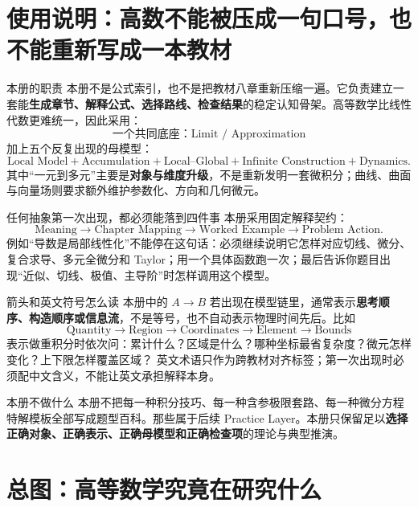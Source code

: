 \documentclass[11pt,a4paper,openany]{ctexbook}
\newcommand{\key}[1]{\textbf{\color{deep}#1}}
\begin{document}
\chapter*{使用说明：高数不能被压成一句口号，也不能重新写成一本教材}

\begin{corebox}{本册的职责}
本册不是公式索引，也不是把教材八章重新压缩一遍。它负责建立一套能\key{生成章节、解释公式、选择路线、检查结果}的稳定认知骨架。高等数学比线性代数更难统一，因此采用：
\[
\boxed{\text{一个共同底座：Limit / Approximation}}
\]
加上五个反复出现的母模型：
\[
\boxed{\text{Local Model}+\text{Accumulation}+\text{Local--Global}+\text{Infinite Construction}+\text{Dynamics}}.
\]
其中“一元到多元”主要是\key{对象与维度升级}，不是重新发明一套微积分；曲线、曲面与向量场则要求额外维护参数化、方向和几何微元。
\end{corebox}

\begin{methodbox}{任何抽象第一次出现，都必须能落到四件事}
本册采用固定解释契约：
\[
\boxed{\text{Meaning}\to\text{Chapter Mapping}\to\text{Worked Example}\to\text{Problem Action}}.
\]
例如“导数是局部线性化”不能停在这句话：必须继续说明它怎样对应切线、微分、复合求导、多元全微分和 Taylor；用一个具体函数跑一次；最后告诉你题目出现“近似、切线、极值、主导阶”时怎样调用这个模型。
\end{methodbox}

\begin{methodbox}{箭头和英文符号怎么读}
本册中的 $A\to B$ 若出现在模型链里，通常表示\key{思考顺序、构造顺序或信息流}，不是等号，也不自动表示物理时间先后。比如
\[
\text{Quantity}\to\text{Region}\to\text{Coordinates}\to\text{Element}\to\text{Bounds}
\]
表示做重积分时依次问：累计什么？区域是什么？哪种坐标最省复杂度？微元怎样变化？上下限怎样覆盖区域？
英文术语只作为跨教材对齐标签；第一次出现时必须配中文含义，不能让英文承担解释本身。
\end{methodbox}

\begin{warnbox}{本册不做什么}
本册不把每一种积分技巧、每一种含参极限套路、每一种微分方程特解模板全部写成题型百科。那些属于后续 Practice Layer。本册只保留足以\key{选择正确对象、正确表示、正确母模型和正确检查项}的理论与典型推演。
\end{warnbox}

\tableofcontents
\mainmatter

\chapter{总图：高等数学究竟在研究什么}
\end{document}
